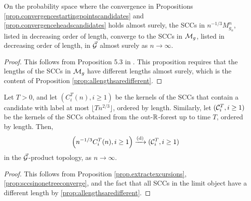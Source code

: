 \begin{proposition}
\label{prop:sccsinonetreeconverge}
On the probability space where the convergence in Propositions \ref{prop.convergencestartingpointscandidates} and \ref{prop.convergenceheadscandidates} holds almost surely, the SCCs in $n^{-1/3}M^n_{g_n}$, listed in decreasing order of length, converge to the SCCs in ${\mathcal M}_g$, listed in decreasing order of length, in $\vec{{\mathcal G}}$ almost surely as $n\to \infty$.
\end{proposition}
\begin{proof}
This follows from Proposition 5.3 in \cite{goldschmidtScalingLimitCritical2019}. This proposition requires that the lengths of the SCCs in ${\mathcal M}_{g}$ have different lengths almost surely, which is the content of Proposition \ref{prop:allengthsaredifferent}. 
\end{proof}

\begin{proposition}
\label{prop:sccordereduptotimeT}
Let $T>0$, and let $(C^T_i(n),i\geq 1)$ be the kernels of the SCCs that contain a candidate with label at most $\lfloor T n^{2/3}\rfloor$, ordered by length. Similarly, let $({\mathcal C}^T_i,i\geq 1)$ be the kernels of the SCCs obtained from the out-${\mathbb R}$-forest up to time $T$, ordered by length. Then,
$$\left(n^{-1/3}C^T_i(n), i\geq 1\right) \xrightarrow[]{\mathrm{(d)}} ({\mathcal C}^T_i,i\geq 1)$$
in the $\vec{{\mathcal G}}$-product topology, as $n\to \infty$. 
\end{proposition}
\begin{proof}
This follows from Proposition \ref{prop.extractexcursions}, \cref{prop:sccsinonetreeconverge}, and the fact that all SCCs in the limit object have a different length by \cref{prop:allengthsaredifferent}. 
\end{proof}

